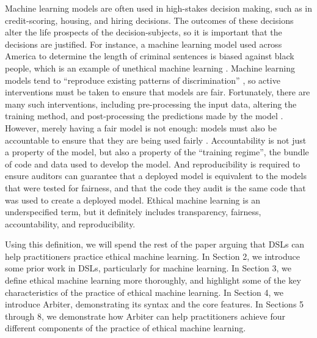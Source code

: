 \documentclass[letterpaper]{article}
\newcommand{\citep}[1]{\cite{#1}}
\begin{document}
Machine learning models are often used in high-stakes decision making, such as in credit-scoring, housing, and hiring decisions. The outcomes of these decisions alter the life prospects of the decision-subjects, so it is important that the decisions are justified. For instance, a machine learning model used across America to determine the length of criminal sentences is biased against black people, which is an example of unethical machine learning \citep{Kirchner2016}. Machine learning models tend to ``reproduce existing patterns of discrimination'' \citep{Barocas2016}, so active interventions must be taken to ensure that models are fair. Fortunately, there are many such interventions, including pre-processing the input data, altering the training method, and post-processing the predictions made by the model \cite{Bellamy2018,Hajian2016}. However, merely having a fair model is not enough: models must also be accountable to ensure that they are being used fairly \citep{Binns2018}. Accountability is not just a property of the model, but also a property of the ``training regime'', the bundle of code and data used to develop the model. And reproducibility is required to ensure auditors can guarantee that a deployed model is equivalent to the models that were tested for fairness, and that the code they audit is the same code that was used to create a deployed model. Ethical machine learning is an underspecified term, but it definitely includes transparency, fairness, accountability, and reproducibility.

Using this definition, we will spend the rest of the paper arguing that DSLs can help practitioners practice ethical machine learning. In Section 2, we introduce some prior work in DSLs, particularly for machine learning. In Section 3, we define ethical machine learning more thoroughly, and highlight some of the key characteristics of the practice of ethical machine learning. In Section 4, we introduce Arbiter, demonstrating its syntax and the core features. In Sections 5 through 8, we demonstrate how Arbiter can help practitioners achieve four different components of the practice of ethical machine learning. 
\end{document}
